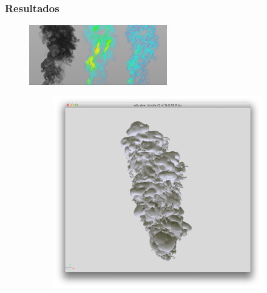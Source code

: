 \documentclass{beamer}
\begin{document}
\begin{frame}

\frametitle{Resultados}

\begin{figure}[!htb]
\center
\includegraphics[width=6cm]{example_vector}  
\end{figure}

\begin{figure}[H]
        \centering
        \begin{subfigure}{0.3\textwidth}
                \includegraphics[width=\textwidth]{vdb_view1}
        \end{subfigure}%
        ~ %
        \begin{subfigure}{0.3\textwidth}

\end{subfigure}
\end{figure}
\end{frame}
\end{document}
